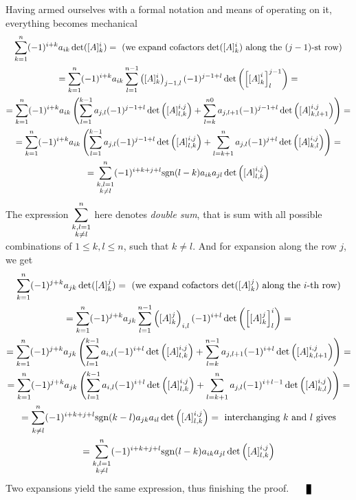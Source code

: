 \documentclass[8pt]{article} %
\begin{document}
Having armed ourselves with a formal notation and means of operating on it, everything becomes mechanical
\newcommand{\sgn}{\mbox{sgn}}
\begin{gather*}
	\sum_{k=1}^n(-1)^{i+k}a_{ik}\det([A]_k^i)=\mbox{ (we expand cofactors $\det([A]_k^i)$ along the $(j-1)$-st row)}\\
	=\sum_{k=1}^n(-1)^{i+k}a_{ik}\sum_{l=1}^{n-1}\mybra{[A]_k^i}_{j-1,l}(-1)^{j-1+l}\det\mybra{\mysbra{\mysbra{A}_k^i}_l^{j-1}}=\\
	=\sum_{k=1}^n(-1)^{i+k}a_{ik}\left(
		\sum_{l=1}^{k-1}a_{j,l}(-1)^{j-1+l}\det\mybra{\mysbra{A}^{i,j}_{l,k}}+
		\sum_{l=k}^{n0}a_{j,l+1}(-1)^{j-1+l}\det\mybra{\mysbra{A}^{i,j}_{k,l+1}}
	\right)=\\
	=\sum_{k=1}^n(-1)^{i+k}a_{ik}\left(
		\sum_{l=1}^{k-1}a_{j,l}(-1)^{j-1+l}\det\mybra{\mysbra{A}^{i,j}_{l,k}}+
		\sum_{l=k+1}^{n}a_{j,l}(-1)^{j+l}\det\mybra{\mysbra{A}^{i,j}_{k,l}}
	\right)=\\
	=\sum_{{\begin{subarray}{c}k,l=1\\k\neq l\end{subarray}}
	}^n(-1)^{i+k+j+l}\sgn(l-k)a_{ik}a_{jl}\det\mybra{\mysbra{A}^{i,j}_{l,k}}
\end{gather*}
The expression $\sum_{{\begin{subarray}{c}k,l=1\\k\neq l\end{subarray}}}^n$ here denotes {\it double sum}, that is sum with all possible
combinations of $1\leq k,l\leq n$, such that $k\neq l$.
And for expansion along the row $j$, we get
\begin{gather*}
	\sum_{k=1}^n(-1)^{j+k}a_{jk}\det([A]_k^j)=\mbox{ (we expand cofactors $\det([A]_k^j)$ along the $i$-th row)}\\
	=\sum_{k=1}^n(-1)^{j+k}a_{jk}\sum_{l=1}^{n-1}\mybra{[A]_k^j}_{i,l}(-1)^{i+l}\det\mybra{\mysbra{\mysbra{A}_k^j}_l^i}=\\
	=\sum_{k=1}^n(-1)^{j+k}a_{jk}\left(
		\sum_{l=1}^{k-1}a_{i,l}(-1)^{i+l}\det\mybra{\mysbra{A}^{i,j}_{l,k}}+
		\sum_{l=k}^{n-1}a_{j,l+1}(-1)^{i+l}\det\mybra{\mysbra{A}^{i,j}_{k,l+1}}
	\right)=\\
	=\sum_{k=1}^n(-1)^{j+k}a_{jk}\left(
		\sum_{l=1}^{k-1}a_{i,l}(-1)^{i+l}\det\mybra{\mysbra{A}^{i,j}_{l,k}}+
		\sum_{l=k+1}^{n}a_{j,l}(-1)^{i+l-1}\det\mybra{\mysbra{A}^{i,j}_{k,l}}
	\right)=\\
	=\sum_{{\begin{subarray}{c}\\k\neq l\end{subarray}}
		}^n(-1)^{i+k+j+l}\sgn(k-l)a_{jk}a_{il}\det\mybra{\mysbra{A}^{i,j}_{l,k}}=\mbox{ interchanging $k$ and $l$ gives}\\
	=\sum_{{\begin{subarray}{c}k,l=1\\k\neq l\end{subarray}}
	}^n(-1)^{i+k+j+l}\sgn(l-k)a_{ik}a_{jl}\det\mybra{\mysbra{A}^{i,j}_{l,k}}
\end{gather*}
Two expansions yield the same expression, thus finishing the proof. $\myqed$
\end{document}
